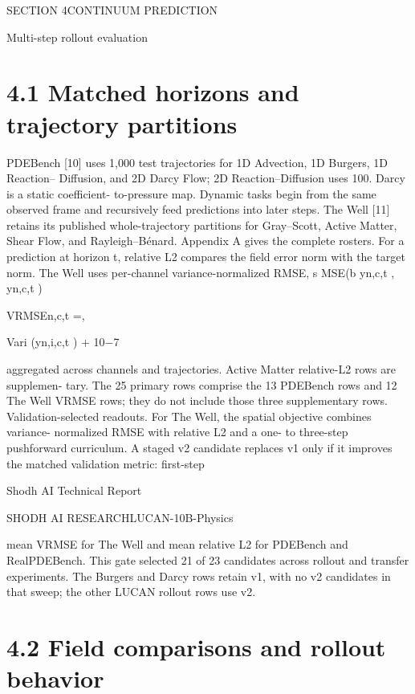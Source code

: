 \documentclass[11pt]{article}
\begin{document}
\noindent SECTION 4\quad CONTINUUM PREDICTION\par


Multi-step rollout evaluation


\section*{4.1 Matched horizons and trajectory partitions}

PDEBench [10] uses 1,000 test trajectories for 1D Advection, 1D Burgers, 1D Reaction–
Diffusion, and 2D Darcy Flow; 2D Reaction–Diffusion uses 100. Darcy is a static coefficient-
to-pressure map. Dynamic tasks begin from the same observed frame and recursively feed
predictions into later steps. The Well [11] retains its published whole-trajectory partitions
for Gray–Scott, Active Matter, Shear Flow, and Rayleigh–Bénard. Appendix A gives the
complete rosters.
For a prediction at horizon t, relative L2 compares the field error norm with the target
norm. The Well uses per-channel variance-normalized RMSE,
s
MSE(b  yn,c,t , yn,c,t )

\noindent VRMSEn,c,t =\quad ,\par

Vari (yn,i,c,t ) + 10\ensuremath{-}7

aggregated across channels and trajectories. Active Matter relative-L2 rows are supplemen-
tary. The 25 primary rows comprise the 13 PDEBench rows and 12 The Well VRMSE rows;
they do not include those three supplementary rows.
Validation-selected readouts. For The Well, the spatial objective combines variance-
normalized RMSE with relative L2 and a one- to three-step pushforward curriculum. A
staged v2 candidate replaces v1 only if it improves the matched validation metric: first-step



\noindent Shodh AI Technical Report\par




\noindent SHODH AI RESEARCH\quad LUCAN-10B-Physics\par



mean VRMSE for The Well and mean relative L2 for PDEBench and RealPDEBench. This
gate selected 21 of 23 candidates across rollout and transfer experiments. The Burgers and
Darcy rows retain v1, with no v2 candidates in that sweep; the other LUCAN rollout rows
use v2.

\section*{4.2 Field comparisons and rollout behavior}
\end{document}
